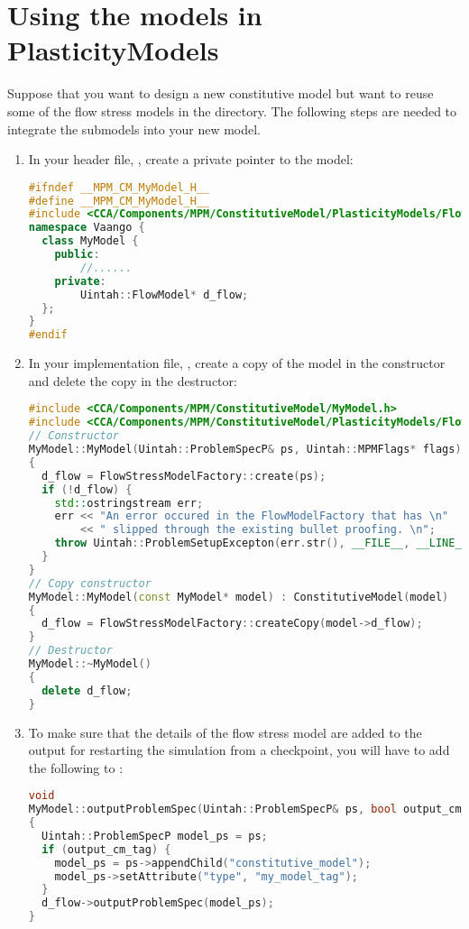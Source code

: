 \section{Using the models in PlasticityModels}
Suppose that you want to design a new constitutive model 
but want to reuse some of the flow stress models in 
the  directory.
The following steps are needed to integrate the submodels into your new model.

\begin{enumerate}
  \item In your header file, , create a private pointer to the
        model:
\begin{lstlisting}[language=Cpp]
#ifndef __MPM_CM_MyModel_H__
#define __MPM_CM_MyModel_H__
#include <CCA/Components/MPM/ConstitutiveModel/PlasticityModels/FlowModel.h>
namespace Vaango {
  class MyModel {
    public:
        //......
    private:
        Uintah::FlowModel* d_flow;  
  };
}
#endif
\end{lstlisting}

  \item In your implementation file, , create a copy of the
        model in the constructor and delete the copy in the destructor:
\begin{lstlisting}[language=Cpp]
#include <CCA/Components/MPM/ConstitutiveModel/MyModel.h>
#include <CCA/Components/MPM/ConstitutiveModel/PlasticityModels/FlowStressModelFactory.h>
// Constructor
MyModel::MyModel(Uintah::ProblemSpecP& ps, Uintah::MPMFlags* flags) : ConstitutiveModel(flags)
{
  d_flow = FlowStressModelFactory::create(ps);
  if (!d_flow) {
    std::ostringstream err;
    err << "An error occured in the FlowModelFactory that has \n"
        << " slipped through the existing bullet proofing. \n";
    throw Uintah::ProblemSetupExcepton(err.str(), __FILE__, __LINE__);
  }
}
// Copy constructor
MyModel::MyModel(const MyModel* model) : ConstitutiveModel(model)
{
  d_flow = FlowStressModelFactory::createCopy(model->d_flow);
}
// Destructor
MyModel::~MyModel()
{
  delete d_flow;
}
\end{lstlisting}

  \item To make sure that the details of the flow stress model are added to the output for
        restarting the simulation from a checkpoint, you will have to add the
        following to :
\begin{lstlisting}[language=Cpp]
void
MyModel::outputProblemSpec(Uintah::ProblemSpecP& ps, bool output_cm_tag)
{
  Uintah::ProblemSpecP model_ps = ps;
  if (output_cm_tag) {
    model_ps = ps->appendChild("constitutive_model");
    model_ps->setAttribute("type", "my_model_tag");
  }
  d_flow->outputProblemSpec(model_ps);
}
\end{lstlisting}


\end{enumerate}
